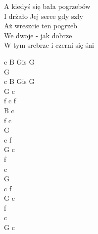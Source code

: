 \begin{text}
    \vin A kiedyś się bała pogrzebów\\
    \vin I drżało Jej serce gdy szły\\
    \vin Aż wreszcie ten pogrzeb\\
    \vin We dwoje - jak dobrze\\
    \vin W tym srebrze i czerni się śni

\end{text}
\begin{chord}
    c B Gis G\\
    G\\
    c B Gis G\\
    G c\\
    f c f\\
    B c\\
    f c\\
    G\\

    c f\\
    G c\\
    f\\
    c\\
    G\\
    c f\\
    G c\\
    f\\
    c\\
    G c
\end{chord}
